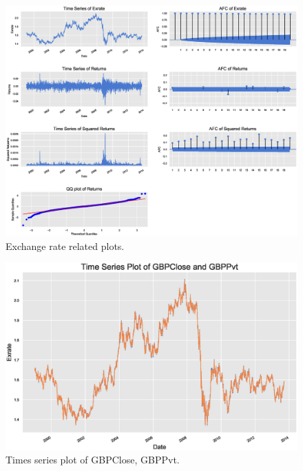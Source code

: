	\begin{figure}[!ht]
	\centering
	\includegraphics[width=\textwidth]{chapters/chapter_uvts/figures/31graphs.eps}
	\caption{Exchange rate related plots. \label{fig:exchrate}}
	\end{figure}

	\begin{figure}[!ht]
	\centering
	\includegraphics[width=\textwidth]{chapters/chapter_uvts/figures/Sec2-4Fig4.eps}
	\caption{Times series plot of GBPClose, GBPPvt. \label{fig:timegbp}}
	\end{figure}
	
